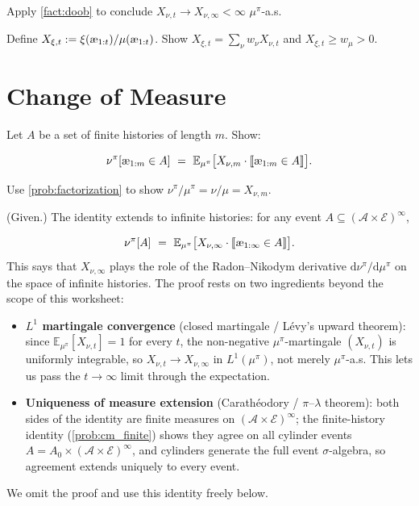 \documentclass[fontsize=11pt, parskip=half]{scrartcl}
\newcommand{\cA}{\mathcal{A}}
\newcommand{\cE}{\mathcal{E}}
\newcommand{\Ex}{\mathbb{E}}
\newcommand{\aes}{\textnormal{\ae}}
\begin{document}
\begin{exercise}
\label{prob:X_converges}
Apply \cref{fact:doob} to conclude $X_{\nu,t} \to X_{\nu,\infty} < \infty$ $\mu^\pi$-a.s.

\end{exercise}


\begin{exercise}
\label{prob:X_bounded_mu}
Define $X_{\xi,t} := \xi(\aes_{1:t})/\mu(\aes_{1:t})$. 
Show $X_{\xi,t} = \sum_\nu w_\nu X_{\nu,t}$ and $X_{\xi,t} \geq w_\mu > 0$.

\end{exercise}



\section{Change of Measure}\label{prob:change_measure}

\begin{exercise}
\label{prob:cm_finite}
Let $A$ be a set of finite histories of length $m$. Show:

\[
    \nu^\pi[\aes_{1:m} \in A] ~=~ \Ex_{\mu^\pi}\big[X_{\nu,m} \cdot \llbracket \aes_{1:m} \in A \rrbracket\big].
\]
\begin{hint}
Use \cref{prob:factorization} to show $\nu^\pi/\mu^\pi = \nu/\mu = X_{\nu,m}$.
\end{hint}
\end{exercise}


\begin{exercise}
\label{prob:cm_extension}
\textup{(Given.)} The identity extends to infinite histories: for any event $A \subseteq (\cA \times \cE)^\infty$,

\[
    \nu^\pi[A] ~=~ \Ex_{\mu^\pi}\big[X_{\nu,\infty} \cdot \llbracket \aes_{1:\infty} \in A \rrbracket\big].
\]
This says that $X_{\nu,\infty}$ plays the role of the Radon--Nikodym derivative $\mathrm{d}\nu^\pi/\mathrm{d}\mu^\pi$ on the space of infinite histories. The proof rests on two ingredients beyond the scope of this worksheet:
\begin{itemize}
    \item \textbf{$L^1$ martingale convergence} (closed martingale / L\'evy's upward theorem): since $\Ex_{\mu^\pi}[X_{\nu,t}] = 1$ for every $t$, the non-negative $\mu^\pi$-martingale $(X_{\nu,t})$ is uniformly integrable, so $X_{\nu,t} \to X_{\nu,\infty}$ in $L^1(\mu^\pi)$, not merely $\mu^\pi$-a.s. This lets us pass the $t\to\infty$ limit through the expectation.
    \item \textbf{Uniqueness of measure extension} (Carath\'eodory / $\pi$--$\lambda$ theorem): both sides of the identity are finite measures on $(\cA\times\cE)^\infty$; the finite-history identity (\cref{prob:cm_finite}) shows they agree on all cylinder events $A = A_0 \times (\cA\times\cE)^\infty$, and cylinders generate the full event $\sigma$-algebra, so agreement extends uniquely to every event.
\end{itemize}
We omit the proof and use this identity freely below.
\end{exercise}
\end{document}
